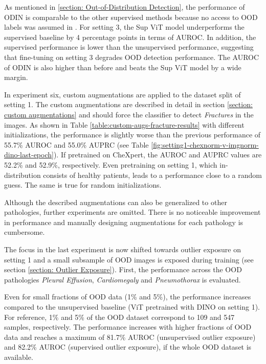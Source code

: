 As mentioned in \ref{section: Out-of-Distribution Detection}, the performance of ODIN is comparable to the other supervised methods because no access to OOD labels was assumed in \citep{Berger2021}.
For setting 3, the Sup ViT model underperforms the supervised baseline by 4 percentage points in terms of AUROC.
In addition, the supervised performance is lower than the unsupervised performance, suggesting that fine-tuning on setting 3 degrades OOD detection performance.
The AUROC of ODIN is also higher than before and beats the Sup ViT model by a wide margin.
\par
In experiment six, custom augmentations are applied to the dataset split of setting 1.
The custom augmentations are described in detail in section \ref{section: custom augmentations} and should force the classifier to detect \textit{Fractures} in the images.
As shown in Table \ref{table:custom-augs-fracture-results} with different initializations, the performance is slightly worse than the previous performance of 55.7\% AUROC and 55.0\% AUPRC (see Table \ref{fig:setting1-chexnorm-v-imgnorm-dino-last-epoch}).
If pretrained on CheXpert, the AUROC and AUPRC values are 52.2\% and 52.9\%, respectively. 
Even pretraining on setting 1, which in-distribution consists of healthy patients, leads to a performance close to a random guess.
The same is true for random initializations.
\par
Although the described augmentations can also be generalized to other pathologies, further experiments are omitted.
There is no noticeable improvement in performance and manually designing augmentations for each pathology is cumbersome.
\par
The focus in the last experiment is now shifted towards outlier exposure on setting 1 and a small subsample of OOD images is exposed during training (see section \ref{section: Outlier Exposure}).
First, the performance across the OOD pathologies \textit{Pleural Effusion}, \textit{Cardiomegaly} and \textit{Pneumothorax} is evaluated.
\par
Even for small fractions of OOD data (1\% and 5\%), the performance increases compared to the unsupervised baseline (ViT pretrained with DINO on setting 1).
For reference, 1\% and 5\% of the OOD dataset correspond to 109 and 547 samples, respectively.
The performance increases with higher fractions of OOD data and reaches a maximum of 81.7\% AUROC (unsupervised outlier exposure) and 82.2\% AUROC (supervised outlier exposure), if the whole OOD dataset is available.
